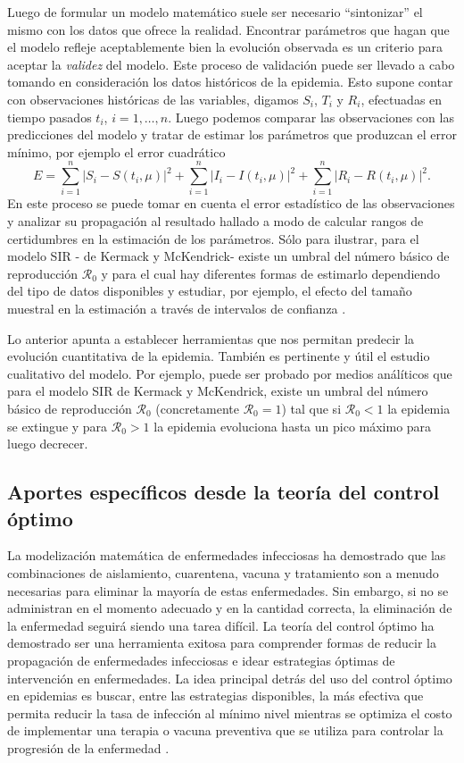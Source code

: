 \documentclass{article}
\begin{document}
 Luego de formular un modelo matemático suele ser necesario ``sintonizar'' el mismo con los datos que ofrece la realidad. Encontrar parámetros que hagan que el modelo refleje aceptablemente bien la evolución observada es un criterio para aceptar la \emph{validez} del modelo. Este proceso de validación puede ser llevado a cabo tomando en consideración los datos históricos de la epidemia. Esto supone contar con observaciones históricas de las variables, digamos $S_i$, $T_i$ y $R_i$, efectuadas en tiempo pasados $t_i$, $i=1,\ldots,n$. Luego podemos comparar las observaciones con las predicciones del modelo y tratar de estimar los parámetros que produzcan el error mínimo, por ejemplo el error cuadrático
 \[
 E=\sum_{i=1}^n|S_i-S(t_i,\mu)|^2+\sum_{i=1}^n|I_i-I(t_i,\mu)|^2+\sum_{i=1}^n|R_i-R(t_i,\mu)|^2.
 \]
 En este proceso se puede tomar en cuenta el error estadístico de  las observaciones y analizar su propagación al resultado hallado a modo de calcular  rangos de certidumbres en la estimación de los parámetros. Sólo para ilustrar, para el modelo SIR - de  Kermack y McKendrick-  existe un  umbral   del número básico de reproducción $\mathcal{R}_0$   y para el cual hay diferentes formas de estimarlo dependiendo del tipo de datos disponibles y estudiar, por ejemplo, el efecto del tamaño muestral en la estimación a través de intervalos de confianza \citep{KR}.
 
  
 Lo anterior apunta a establecer herramientas  que nos permitan predecir la evolución cuantitativa de la epidemia. También es pertinente y útil el estudio cualitativo del modelo.  Por ejemplo, puede ser probado por medios análíticos que para el modelo SIR de 
 Kermack y McKendrick, existe un  umbral   del número básico de reproducción $\mathcal{R}_0$ (concretamente $\mathcal{R}_0=1$) tal que si $\mathcal{R}_0<1$ la epidemia se extingue y para $\mathcal{R}_0>1$ la epidemia evoluciona hasta un pico máximo para luego decrecer. 
  
 
 \subsection{Aportes específicos desde la teoría del control óptimo } 

 
 La modelización matemática de enfermedades infecciosas ha demostrado que las combinaciones de aislamiento, cuarentena, vacuna y tratamiento son a menudo necesarias para eliminar la mayoría de estas enfermedades. Sin embargo, si no se administran en el momento adecuado y en la cantidad correcta, la eliminación de la enfermedad seguirá siendo una tarea difícil. La teoría del control óptimo ha demostrado ser una herramienta exitosa para comprender formas de reducir la propagación de enfermedades infecciosas e idear estrategias óptimas de intervención en enfermedades. La idea principal detrás del uso del control óptimo en epidemias es buscar, entre las estrategias disponibles, la más efectiva que permita reducir la tasa de infección al mínimo nivel mientras se optimiza el costo de implementar una terapia o vacuna preventiva que se utiliza para controlar la progresión de la enfermedad \cite{GerardoChowell487}. 
 
\end{document}

